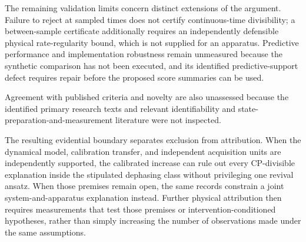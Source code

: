 \documentclass[11pt]{article}
\begin{document}
The remaining validation limits concern distinct extensions of the argument. Failure to reject at sampled times does not certify continuous-time divisibility; a between-sample certificate additionally requires an independently defensible physical rate-regularity bound, which is not supplied for an apparatus. Predictive performance and implementation robustness remain unmeasured because the synthetic comparison has not been executed, and its identified predictive-support defect requires repair before the proposed score summaries can be used.

Agreement with published criteria and novelty are also unassessed because the identified primary research texts and relevant identifiability and state-preparation-and-measurement literature were not inspected.

The resulting evidential boundary separates exclusion from attribution. When the dynamical model, calibration transfer, and independent acquisition units are independently supported, the calibrated increase can rule out every CP-divisible explanation inside the stipulated dephasing class without privileging one revival ansatz. When those premises remain open, the same records constrain a joint system-and-apparatus explanation instead. Further physical attribution then requires measurements that test those premises or intervention-conditioned hypotheses, rather than simply increasing the number of observations made under the same assumptions.
\end{document}
